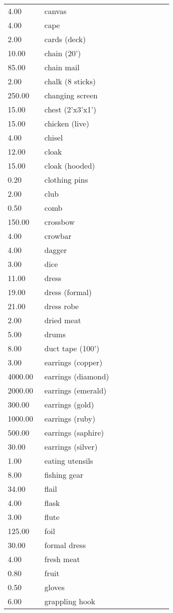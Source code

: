 \begin{tcolorbox}[breakable,boxrule=0pt,title=\textbf{Equipment Costs}]
\begin{xtabular}{@{}p{0.2\linewidth} p{0.7\linewidth}}
4.00 & canvas\\
4.00 & cape\\
2.00 & cards (deck)\\
10.00 & chain (20')\\
85.00 & chain mail\\
2.00 & chalk (8 sticks)\\
250.00 & changing screen\\
15.00 & chest (2'x3'x1')\\
15.00 & chicken (live)\\
4.00 & chisel\\
12.00 & cloak\\
15.00 & cloak (hooded)\\
0.20 & clothing pins\\
2.00 & club\\
0.50 & comb\\
150.00 & crossbow\\
4.00 & crowbar\\
4.00 & dagger\\
3.00 & dice\\
11.00 & dress\\
19.00 & dress (formal)\\
21.00 & dress robe\\
2.00 & dried meat\\
5.00 & drums\\
8.00 & duct tape (100')\\
3.00 & earrings (copper)\\
4000.00 & earrings (diamond)\\
2000.00 & earrings (emerald)\\
300.00 & earrings (gold)\\
1000.00 & earrings (ruby)\\
500.00 & earrings (saphire)\\
30.00 & earrings (silver)\\
1.00 & eating utensils\\
8.00 & fishing gear\\
34.00 & flail\\
4.00 & flask\\
3.00 & flute\\
125.00 & foil\\
30.00 & formal dress\\
4.00 & fresh meat\\
0.80 & fruit\\
0.50 & gloves\\
6.00 & grappling hook\\

\end{xtabular}
\end{tcolorbox}
